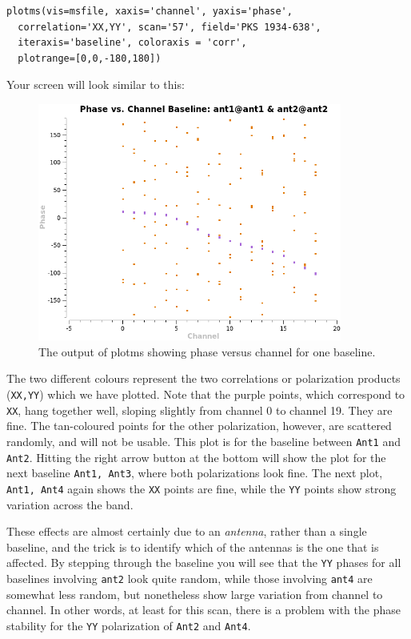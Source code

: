 \documentclass[force,almostfull,justified]{tufte-book}
\begin{document}
\begin{casacmd}
\begin{verbatim}
plotms(vis=msfile, xaxis='channel', yaxis='phase',
  correlation='XX,YY', scan='57', field='PKS 1934-638',
  iteraxis='baseline', coloraxis = 'corr',
  plotrange=[0,0,-180,180])
\end{verbatim}
\end{casacmd}

Your screen will look similar to this:
\begin{figure}
  \includegraphics[width=10cm]{images/plotms_phas_v_channel_bl1}
  \caption[Mind map.]{The output of plotms showing phase versus channel
for one baseline.}
  \forceversofloat
  \label{fig:plotms_amp_v_channel}
\end{figure}

The two different colours represent the two correlations or polarization products ({\tt XX,YY}) which
we have plotted.  Note that the purple points, which correspond to {\tt XX}, hang together well,
sloping slightly from channel 0 to channel 19.  They are fine.  The tan-coloured points for the other
polarization, however, are scattered randomly, and will not be usable.  This plot is for the baseline
between {\tt Ant1} and {\tt Ant2}.  Hitting the right arrow button at the bottom will show the plot
for the next baseline {\tt Ant1, Ant3}, where both polarizations look fine.  The next plot, {\tt Ant1,
Ant4} again shows the {\tt XX} points are fine, while the {\tt YY} points show strong variation across
the band.

These effects are almost certainly due to an {\em antenna}, rather than a single baseline, and the
trick is to identify which of the antennas is the one that is affected.  By stepping through the
baseline you will see that the {\tt YY} phases for all baselines involving {\tt ant2} look quite
random, while those involving {\tt ant4} are somewhat less random, but nonetheless show large
variation from channel to channel.  In other words, at least for this scan, there is a problem with
the phase stability for the {\tt YY} polarization of {\tt Ant2} and {\tt Ant4}.
\end{document}
